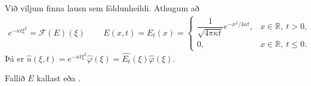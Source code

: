 \documentclass[a4paper,10pt,icelandic]{sphinxmanual}
\begin{document}
Við viljum finna lausn sem földunheildi. Athugum að
\begin{equation*}
\begin{split}e^{-{\kappa}t{\xi}^2} = \mathcal{F}(E)(\xi)\,
\qquad E(x,t)=E_t(x)=\begin{cases} \dfrac 1{\sqrt{4{\pi}{\kappa}t}}e^{-x^2/4{\kappa}t},
&x\in {{\mathbb  R}}, \ t>0,\\
0, &x\in {{\mathbb  R}}, \ t\leq 0.\end{cases}\end{split}
\end{equation*}
Þá er \(\widehat u({\xi},t)=e^{-{\kappa}t{\xi}^2}\widehat {\varphi}({\xi})= \widehat{E_t} ({\xi})\widehat {\varphi}({\xi})\).

Fallið \(E\) kallast  eða .
\end{document}
